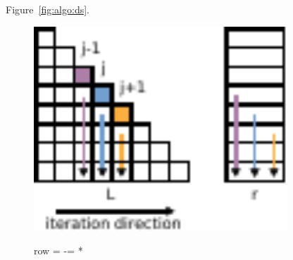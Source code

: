 Figure~\ref{fig:algo:ds}. 
%
\begin{figure}[t]
    \centering
    \begin{minipage}{.35\textwidth}
        \centering
        \includegraphics[width=0.85\textwidth,clip=true]{images/forward-small}
    \end{minipage}%
    \begin{minipage}{0.65\textwidth}
        \centering
  \begin{algorithmic}[1]
            \label{algo:fw:cholmod}
                   \State row = \nindx[i]
                   \State \nr[row] -=  \nr[j] * \nlnz[i] 
            \EndFor\label{algo:fw:cholmod:rloop:end}
      \EndFor
    \EndProcedure
  \end{algorithmic}
    \end{minipage}

\bigskip


\end{figure}
